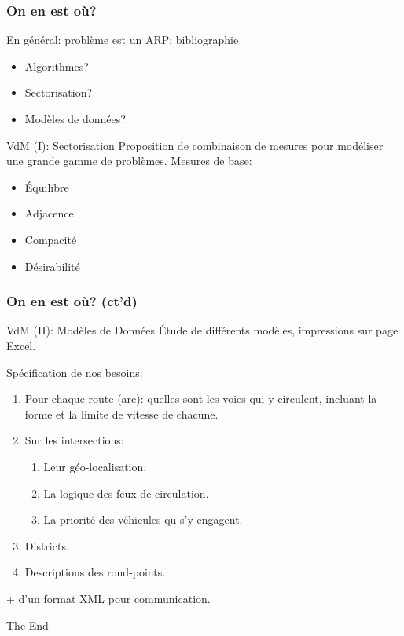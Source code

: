 \documentclass[french]{beamer}
\begin{document}
\begin{frame}
\frametitle{On en est où?}

\begin{block}{En général: problème est un ARP: bibliographie}
	\begin{itemize}
		\item Algorithmes? \checkmark
		\item Sectorisation? \checkmark
		\item Modèles de données? \checkmark
	\end{itemize}
\end{block}

\begin{block}{VdM (I): Sectorisation}
	Proposition de combinaison de mesures pour modéliser une grande gamme de problèmes. 
	Mesures de base:
	\begin{itemize}
		\item Équilibre
		\item Adjacence
		\item Compacité
		\item Désirabilité
	\end{itemize}
\end{block}


\end{frame}


\begin{frame}
\frametitle{On en est où? (ct'd)}

\begin{block}{VdM (II): Modèles de Données}
	Étude de différents modèles, impressions sur page Excel. 
	
	Spécification de nos besoins:
	\begin{enumerate}
		\item Pour chaque route (arc): quelles sont les voies qui y circulent, incluant la forme et la limite de vitesse de chacune.
		\item Sur les intersections:
		\begin{enumerate}
			\item Leur géo-localisation.
			\item La logique des feux de circulation.
			\item La priorité des véhicules qu s'y engagent.
		\end{enumerate}
		\item Districts.
		\item Descriptions des rond-points.
	\end{enumerate}
	+ d'un format XML pour communication.
\end{block}


\end{frame}




\begin{frame}
\Huge{\centerline{The End}}
\end{frame}

\end{document}
